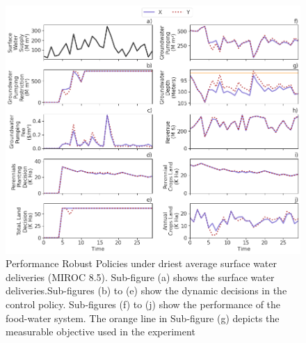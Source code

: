 \documentclass[11pt,a4paper]{article}
\begin{document}
\begin{figure}[H]
    \centering
    \includegraphics[width=1\textwidth]{selected_robust_performance_s2_dry.png}
    \caption{Performance Robust Policies under driest average surface water deliveries (MIROC 8.5). Sub-figure (a) shows the surface water deliveries.Sub-figures (b) to (e) show the dynamic decisions in the control policy. Sub-figures (f) to (j) show the performance of the food-water system. The orange line in Sub-figure (g) depicts the measurable objective used in the experiment}
    \label{fig:m1esh1}
\end{figure}
\end{document}
